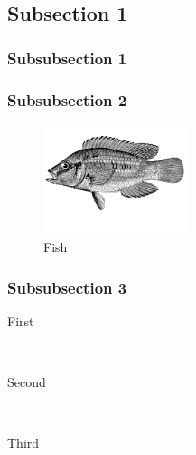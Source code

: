 \documentclass[12pt]{article} %
\begin{document}
\subsection{Subsection 1} %

\subsubsection{Subsubsection 1} %

\lipsum[6] %


\subsubsection{Subsubsection 2} %

\lipsum[6] %
\begin{figure} %
  \begin{center}
    \includegraphics[width=0.38\textwidth]{fish}
  \end{center}
  \caption{Fish}
\end{figure}
\lipsum[7-8] %


\subsubsection{Subsubsection 3} %

\begin{description} %

\item[First] \hfill \\
\lipsum[9] %

\item[Second] \hfill \\
\lipsum[10] %

\item[Third] \hfill \\
\lipsum[11] %

\end{description} 
\end{document}
